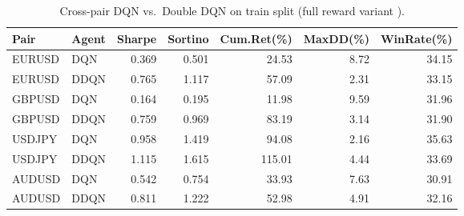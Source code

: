 \begin{table}[!tbp]
\centering
\caption{Cross-pair DQN vs.\ Double DQN on train split (full reward variant  ).}
\label{tab:cross_pair}

\begin{adjustbox}{width=\linewidth}
\begin{tabular}{llrrrrr}
\toprule
\textbf{Pair} & \textbf{Agent} & \textbf{Sharpe} & \textbf{Sortino} & \textbf{Cum.Ret(\%)} & \textbf{MaxDD(\%)} & \textbf{WinRate(\%)} \\
\midrule
EURUSD & DQN & 0.369 & 0.501 & 24.53 & 8.72 & 34.15 \\
EURUSD & DDQN & 0.765 & 1.117 & 57.09 & 2.31 & 33.15 \\
\midrule
GBPUSD & DQN & 0.164 & 0.195 & 11.98 & 9.59 & 31.96 \\
GBPUSD & DDQN & 0.759 & 0.969 & 83.19 & 3.14 & 31.90 \\
\midrule
USDJPY & DQN & 0.958 & 1.419 & 94.08 & 2.16 & 35.63 \\
USDJPY & DDQN & 1.115 & 1.615 & 115.01 & 4.44 & 33.69 \\
\midrule
AUDUSD & DQN & 0.542 & 0.754 & 33.93 & 7.63 & 30.91 \\
AUDUSD & DDQN & 0.811 & 1.222 & 52.98 & 4.91 & 32.16 \\
\bottomrule
\end{tabular}
\end{adjustbox}
\end{table}



